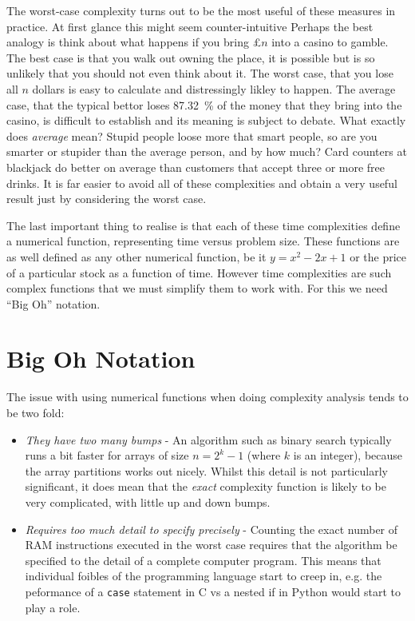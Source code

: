 	The worst-case complexity turns out to be the most useful of these measures in practice. At first glance this might seem counter-intuitive Perhaps the best analogy is think about what happens if you bring £$n$ into a casino to gamble. The best case is that you walk out owning the place, it is possible but is so unlikely that you should not even think about it. The worst case, that you lose all $n$ dollars is easy to calculate and distressingly likley to happen. The average case, that the typical bettor loses \SI{87.32}{\percent} of the money that they bring into the casino, is difficult to establish and its meaning is subject to debate. What exactly does \textit{average} mean? Stupid people loose more that smart people, so are you smarter or stupider than the average person, and by how much? Card counters at blackjack do better on average than customers that accept three or more free drinks. It is far easier to avoid all of these complexities and obtain a very useful result just by considering the worst case.
	
	The last important thing to realise is that each of these time complexities define a numerical function, representing time versus problem size. These functions are as well defined as any other numerical function, be it $y = x^2 - 2x + 1$ or the price of a particular stock as a function of time. However time complexities are such complex functions that we must simplify them to work with.  For this we need \enquote{Big Oh} notation. 
\section{Big Oh Notation}
  The issue with using numerical functions when doing complexity analysis tends to be two fold:
  \begin{itemize}
  	\item \textit{They have two many bumps} - An algorithm such as binary search typically runs a bit faster for arrays of size $n = 2^k - 1$ (where $k$ is an integer), because the array partitions works out nicely. Whilst this detail is not particularly significant, it does mean that the \textit{exact} complexity function is likely to be very complicated, with little up and down bumps. 
  	\item \textit{Requires too much detail to specify precisely} - Counting the exact number of RAM instructions executed in the worst case requires that the algorithm be specified to the detail of a complete computer program. This means that individual foibles of the programming language start to creep in, e.g. the peformance of a \texttt{case} statement in C vs a nested if in Python would start to play a role.  
  \end{itemize}

